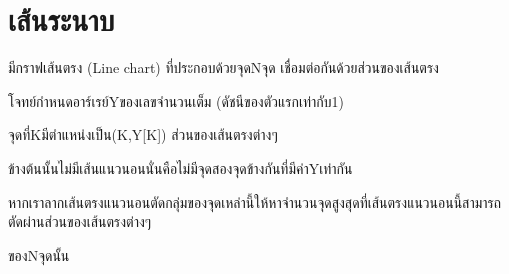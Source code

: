 \documentclass{article}
\begin{document}
\section*{เส้นระนาบ}

มีกราฟเส้นตรง (Line chart) ที่ประกอบด้วยจุดN{}จุด เชื่อมต่อกันด้วยส่วนของเส้นตรง

โจทย์กำหนดอาร์เรย์Yของเลขจำนวนเต็ม (ดัชนีของตัวแรกเท่ากับ1)

จุดที่Kมีตำแหน่งเป็น(K,Y{[}K{]}) ส่วนของเส้นตรงต่างๆ

ข้างต้นนั้นไม่มีเส้นแนวนอนนั่นคือไม่มีจุดสองจุดข้างกันที่มีค่าYเท่ากัน



หากเราลากเส้นตรงแนวนอนตัดกลุ่มของจุดเหล่านี้ให้หาจำนวนจุดสูงสุดที่เส้นตรงแนวนอนนี้สามารถตัดผ่านส่วนของเส้นตรงต่างๆ

ของNจุดนั้น



\hfill\break
\end{document}
